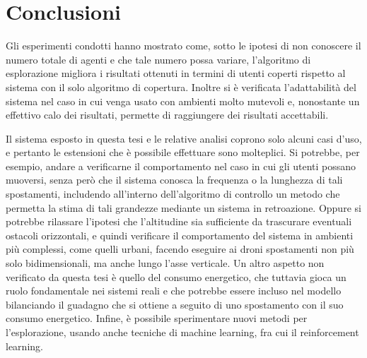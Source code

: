 \chapter{Conclusioni} \label{ch:conclusioni}
Gli esperimenti condotti hanno mostrato come, sotto le ipotesi di non conoscere il numero totale di agenti e che tale numero possa variare, l'algoritmo di esplorazione migliora i risultati ottenuti in termini di utenti coperti rispetto al sistema con il solo algoritmo di copertura.
Inoltre si è verificata l'adattabilità del sistema nel caso in cui venga usato con ambienti molto mutevoli e, nonostante un effettivo calo dei risultati, permette di raggiungere dei risultati accettabili.


Il sistema esposto in questa tesi e le relative analisi coprono solo alcuni casi d'uso, e pertanto le estensioni che è possibile effettuare sono molteplici.
Si potrebbe, per esempio, andare a verificarne il comportamento nel caso in cui gli utenti possano muoversi, senza però che il sistema conosca la frequenza o la lunghezza di tali spostamenti, includendo all'interno dell'algoritmo di controllo un metodo che permetta la stima di tali grandezze mediante un sistema in retroazione.
Oppure si potrebbe rilassare l'ipotesi che l'altitudine sia sufficiente da trascurare eventuali ostacoli orizzontali, e quindi verificare il comportamento del sistema in ambienti più complessi, come quelli urbani, facendo eseguire ai droni spostamenti non più solo bidimensionali, ma anche lungo l'asse verticale.
Un altro aspetto non verificato da questa tesi è quello del consumo energetico, che tuttavia gioca un ruolo fondamentale nei sistemi reali e che potrebbe essere incluso nel modello bilanciando il guadagno che si ottiene a seguito di uno spostamento con il suo consumo energetico.
Infine, è possibile sperimentare nuovi metodi per l'esplorazione, usando anche tecniche di machine learning, fra cui il reinforcement learning.